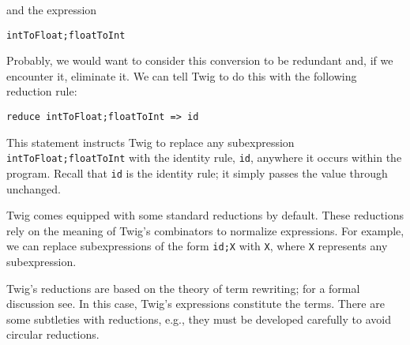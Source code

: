 and the expression

\begin{verbatim}
intToFloat;floatToInt
\end{verbatim}

Probably, we would want to consider this conversion to be redundant and, if we encounter it, eliminate it. We can tell Twig to do this with the following reduction rule:

\begin{verbatim}
reduce intToFloat;floatToInt => id
\end{verbatim}

This statement instructs Twig to replace any subexpression \texttt{intToFloat;floatToInt} with the identity rule, \texttt{id}, anywhere it occurs within the program. Recall that \texttt{id} is the identity rule; it simply passes the value through unchanged.

Twig comes equipped with some standard reductions by default. These reductions rely on the meaning of Twig's combinators to normalize expressions. For example, we can replace subexpressions of the form \texttt{id;X} with \texttt{X}, where \texttt{X} represents any subexpression.

% 
% 

Twig's reductions are based on the theory of term rewriting; for a formal discussion see\cite{baader98rewriting}. In this case, Twig's expressions constitute the terms. There are some subtleties with reductions, e.g., they must be developed carefully to avoid circular reductions.
